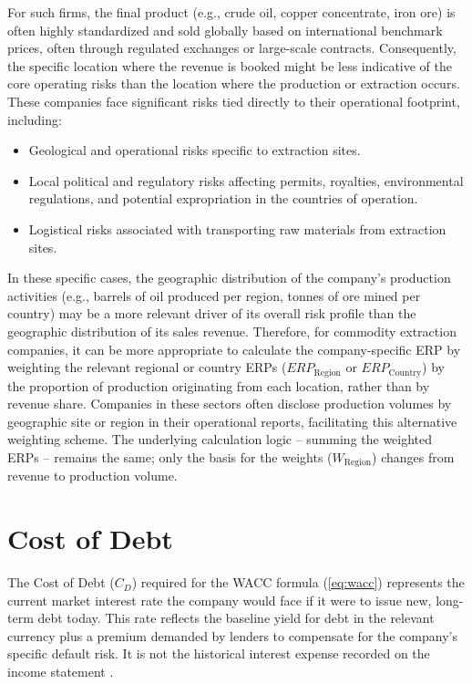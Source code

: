 For such firms, the final product (e.g., crude oil, copper concentrate, iron ore) is often highly standardized and sold globally based on international benchmark prices, often through regulated exchanges or large-scale contracts. Consequently, the specific location where the revenue is booked might be less indicative of the core operating risks than the location where the production or extraction occurs. These companies face significant risks tied directly to their operational footprint, including:
\begin{itemize}
    \item Geological and operational risks specific to extraction sites.
    \item Local political and regulatory risks affecting permits, royalties, environmental regulations, and potential expropriation in the countries of operation.
    \item Logistical risks associated with transporting raw materials from extraction sites.
\end{itemize}
In these specific cases, the geographic distribution of the company's production activities (e.g., barrels of oil produced per region, tonnes of ore mined per country) may be a more relevant driver of its overall risk profile than the geographic distribution of its sales revenue. Therefore, for commodity extraction companies, it can be more appropriate to calculate the company-specific ERP by weighting the relevant regional or country ERPs (\(ERP_{\text{Region}}\) or \(ERP_{\text{Country}}\)) by the proportion of production originating from each location, rather than by revenue share. Companies in these sectors often disclose production volumes by geographic site or region in their operational reports, facilitating this alternative weighting scheme. The underlying calculation logic – summing the weighted ERPs – remains the same; only the basis for the weights (\(W_{\text{Region}}\)) changes from revenue to production volume.


\section{Cost of Debt} \label{sec:cost_of_debt}
The Cost of Debt (\(C_D\)) required for the WACC formula (\ref{eq:wacc}) represents the current market interest rate the company would face if it were to issue new, long-term debt today. This rate reflects the baseline yield for debt in the relevant currency plus a premium demanded by lenders to compensate for the company's specific default risk. It is not the historical interest expense recorded on the income statement \parencite{damodaran2025investment}.


